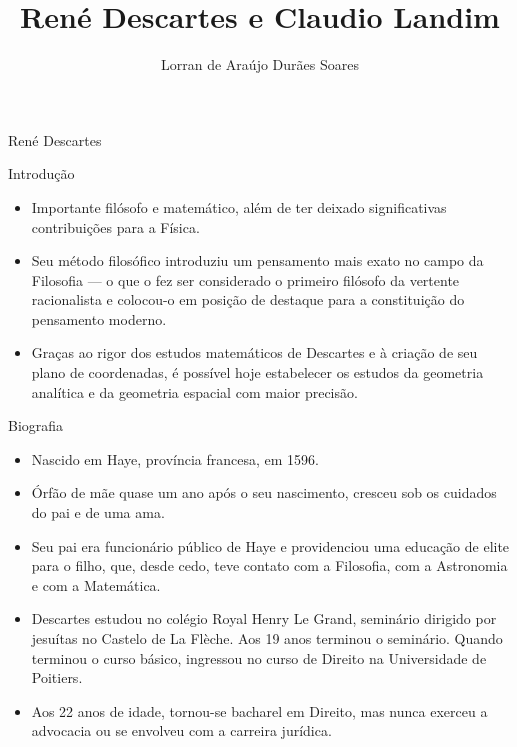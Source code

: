 \documentclass{beamer}
\title{René Descartes e Claudio Landim}
\author{Lorran de Araújo Durães Soares}
\institute{Licenciatura em Matemática\\Universidade Estadual de Montes Claros\\Campus São Francisco - MG}
\begin{document}
\begin{frame}
\titlepage
\end{frame}



\begin{frame}{René Descartes}
    \begin{block}{Introdução}
        \begin{itemize}
            \item Importante filósofo e matemático, além de ter deixado significativas contribuições para a Física. 
            \item Seu método filosófico introduziu um pensamento mais exato no campo da Filosofia — o que o fez ser considerado o primeiro filósofo da vertente racionalista e colocou-o em posição de destaque para a constituição do pensamento moderno. 
            \item Graças ao rigor dos estudos matemáticos de Descartes e à criação de seu plano de coordenadas, é possível hoje estabelecer os estudos da geometria analítica e da geometria espacial com maior precisão.
        \end{itemize}
    \end{block}
\end{frame}




\begin{frame}
    \begin{block}{Biografia}
        \begin{itemize}
            \item Nascido em Haye, província francesa, em 1596. 
            \item Órfão de mãe quase um ano após o seu nascimento, cresceu sob os cuidados do pai e de uma ama. 
            \item Seu pai era funcionário público de Haye e providenciou uma educação de elite para o filho, que, desde cedo, teve contato com a Filosofia, com a Astronomia e com a Matemática.
            \item Descartes estudou no colégio Royal Henry Le Grand, seminário dirigido por jesuítas no Castelo de La Flèche. Aos 19 anos terminou o seminário. Quando terminou o curso básico, ingressou no curso de Direito na Universidade de Poitiers. 
            \item Aos 22 anos de idade, tornou-se bacharel em Direito, mas nunca exerceu a advocacia ou se envolveu com a carreira jurídica.
        \end{itemize}
    \end{block}  
\end{frame}
\end{document}
